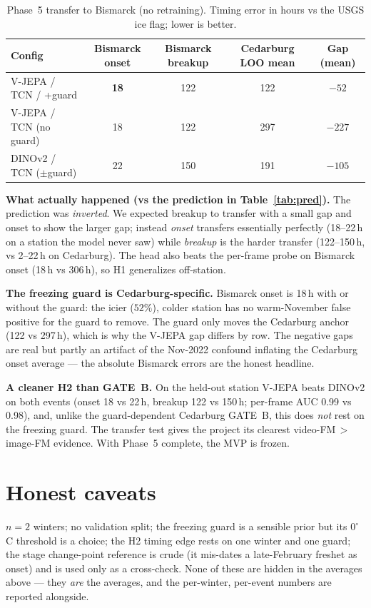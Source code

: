 \documentclass[11pt]{article}
\begin{document}
\begin{table}[h]\centering\small
\caption{Phase~5 transfer to Bismarck (no retraining). Timing error in hours vs the USGS ice flag;
lower is better.}\label{tab:transfer}
\begin{tabular}{lcccc}
\toprule
Config & Bismarck onset & Bismarck breakup & Cedarburg LOO mean & Gap (mean) \\
\midrule
V-JEPA / TCN / +guard      & \textbf{18} & 122 & 122 & $-52$ \\
V-JEPA / TCN (no guard)    & 18 & 122 & 297 & $-227$ \\
DINOv2 / TCN ($\pm$guard)  & 22 & 150 & 191 & $-105$ \\
\bottomrule
\end{tabular}
\end{table}

\textbf{What actually happened (vs the prediction in Table~\ref{tab:pred}).} The prediction was
\emph{inverted}. We expected breakup to transfer with a small gap and onset to show the larger gap;
instead \emph{onset} transfers essentially perfectly (18--22\,h on a station the model never saw)
while \emph{breakup} is the harder transfer (122--150\,h, vs 2--22\,h on Cedarburg). The head also
beats the per-frame probe on Bismarck onset (18\,h vs 306\,h), so H1 generalizes off-station.

\textbf{The freezing guard is Cedarburg-specific.} Bismarck onset is 18\,h with or without the
guard: the icier ($52\%$), colder station has no warm-November false positive for the guard to
remove. The guard only moves the Cedarburg anchor (122 vs 297\,h), which is why the V-JEPA gap
differs by row. The negative gaps are real but partly an artifact of the Nov-2022 confound
inflating the Cedarburg onset average --- the absolute Bismarck errors are the honest headline.

\textbf{A cleaner H2 than GATE~B.} On the held-out station V-JEPA beats DINOv2 on both events
(onset 18 vs 22\,h, breakup 122 vs 150\,h; per-frame AUC 0.99 vs 0.98), and, unlike the
guard-dependent Cedarburg GATE~B, this does \emph{not} rest on the freezing guard. The transfer
test gives the project its clearest video-FM\,$>$\,image-FM evidence. With Phase~5 complete, the
MVP is frozen.

\section*{Honest caveats}
$n=2$ winters; no validation split; the freezing guard is a sensible prior but its $0^\circ$C
threshold is a choice; the H2 timing edge rests on one winter and one guard; the stage change-point
reference is crude (it mis-dates a late-February freshet as onset) and is used only as a
cross-check. None of these are hidden in the averages above --- they \emph{are} the averages, and
the per-winter, per-event numbers are reported alongside.
\end{document}

